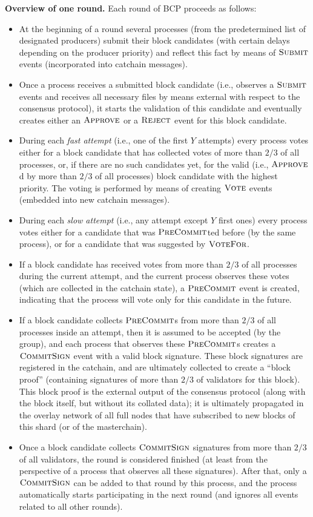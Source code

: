 \documentclass[12pt,oneside]{article}
\def\makepoint#1{\medbreak\noindent{\bf #1.\ }}
\def\nxsubpoint{\refstepcounter{subsubsection}%
  \smallbreak\makepoint{\thesubsubsection}}
\def\emb#1{\textbf{#1.}}
\def\opsc#1{\operatorname{\textsc{#1}}}
\def\Submit{\opsc{Submit}}
\def\Approve{\opsc{Approve}}
\def\Reject{\opsc{Reject}}
\def\PreCommit{\opsc{PreCommit}}
\def\CommitSign{\opsc{CommitSign}}
\def\Vote{\opsc{Vote}}
\def\VoteFor{\opsc{VoteFor}}
\begin{document}
\nxsubpoint\emb{Overview of one round}
Each round of BCP proceeds as follows:
\begin{itemize}
\item At the beginning of a round several processes (from the predetermined list of designated producers) submit their block candidates (with certain delays depending on the producer priority) and reflect this fact by means of $\Submit$ events (incorporated into catchain messages).
\item Once a process receives a submitted block candidate (i.e., observes a $\Submit$ events and receives all necessary files by means external with respect to the consensus protocol), it starts the validation of this candidate and eventually creates either an $\Approve$ or a $\Reject$ event for this block candidate.
\item During each {\em fast attempt\/} (i.e., one of the first $Y$ attempts) every process votes either for a block candidate that has collected votes of more than $2/3$ of all processes, or, if there are no such candidates yet, for the valid (i.e., $\Approve$d by more than $2/3$ of all processes) block candidate with the highest priority. The voting is performed by means of creating $\Vote$ events (embedded into new catchain messages).
\item During each {\em slow attempt\/} (i.e., any attempt except $Y$ first ones) every process votes either for a candidate that was $\PreCommit$ted before (by the same process), or for a candidate that was suggested by $\VoteFor$.
\item If a block candidate has received votes from more than $2/3$ of all processes during the current attempt, and the current process observes these votes (which are collected in the catchain state), a $\PreCommit$ event is created, indicating that the process will vote only for this candidate in the future.
\item If a block candidate collects $\PreCommit$s from more than $2/3$ of all processes inside an attempt, then it is assumed to be accepted (by the group), and each process that observes these $\PreCommit$s creates a $\CommitSign$ event with a valid block signature. These block signatures are registered in the catchain, and are ultimately collected to create a ``block proof'' (containing signatures of more than $2/3$ of validators for this block). This block proof is the external output of the consensus protocol (along with the block itself, but without its collated data); it is ultimately propagated in the overlay network of all full nodes that have subscribed to new blocks of this shard (or of the masterchain).
\item Once a block candidate collects $\CommitSign$ signatures from more than $2/3$ of all validators, the round is considered finished (at least from the perspective of a process that observes all these signatures). After that, only a $\CommitSign$ can be added to that round by this process, and the process automatically starts participating in the next round (and ignores all events related to all other rounds).
\end{itemize}
\end{document}
